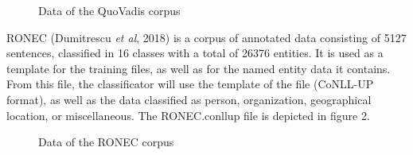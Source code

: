 \documentclass[12pt,a4paper]{article}
\begin{document}
\begin{figure}[h!]
\begin{center}
\end{center}
\caption{Data of the QuoVadis corpus}
\end{figure}

\qquad RONEC (Dumitrescu \textit{et al}, 2018) is a corpus of annotated data consisting of 5127 sentences, classified in 16 classes with a total of 26376 entities. It is used as a template for the training files, as well as for the named entity data it contains. From this file, the classificator will use the template of the file (CoNLL-UP format), as well as the data classified as person, organization, geographical location, or miscellaneous. The RONEC.conllup file is depicted in figure 2. 
\begin{figure}[h!]
\begin{center}
\end{center}
\caption{Data of the RONEC corpus}
\end{figure}
\end{document}
